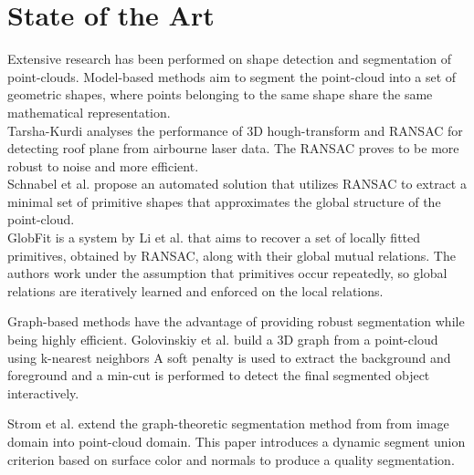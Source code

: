 \section{State of the Art}
Extensive research has been performed on shape detection and segmentation of point-clouds. Model-based methods aim to segment the point-cloud into a set of geometric shapes, where points belonging to the same shape share the same mathematical representation. 
\\
Tarsha-Kurdi\cite{tarsha2007hough} analyses the performance of 3D hough-transform and RANSAC for detecting roof plane from airbourne laser data. The RANSAC proves to be more robust to noise and more efficient.
\\
Schnabel et al. \cite{schnabel-2007-efficient} propose an automated solution that utilizes RANSAC to extract a minimal set of primitive shapes that approximates the global structure of the point-cloud.  
\\
GlobFit is a system by Li et al. \cite{li2011globfit} that aims to recover a set of locally fitted primitives, obtained by RANSAC, along with their global mutual relations. The authors work under the assumption that primitives occur repeatedly, so global relations are iteratively learned and enforced on the local relations. 

Graph-based methods have the advantage of providing robust segmentation while being highly efficient. Golovinskiy et al. \cite{golovinskiy2009min} build a 3D graph from a point-cloud using k-nearest neighbors A soft penalty is used to extract the background and foreground and a min-cut is performed to detect the final segmented object interactively. 

Strom et al. \cite{strom2010graph} extend the graph-theoretic segmentation method from \cite{felzenszwalb2004efficient} from image domain into point-cloud domain. This paper introduces a dynamic segment union criterion based on surface color and normals to produce a quality segmentation. 
